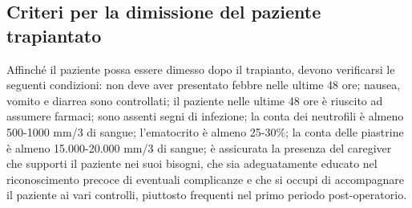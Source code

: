 \subsection{Criteri per la dimissione del paziente trapiantato}

Affinché il paziente possa essere dimesso dopo il trapianto, devono verificarsi le seguenti condizioni: 
non deve aver presentato febbre nelle ultime 48 ore; 
nausea, vomito e diarrea sono controllati; il paziente nelle ultime 48 ore è riuscito ad assumere 
farmaci; sono assenti segni di infezione; la conta dei neutrofili è almeno 500-1000 mm/3 di sangue; l’ematocrito è 
almeno 25-30\%; la conta delle piastrine è almeno 15.000-20.000 mm/3 di sangue; è assicurata la presenza del 
caregiver che supporti il paziente nei suoi bisogni, che sia adeguatamente educato nel riconoscimento precoce di 
eventuali complicanze e che si occupi di accompagnare il paziente ai vari controlli, piuttosto 
frequenti nel primo periodo post-operatorio\cite{STEMCELLS}.





















